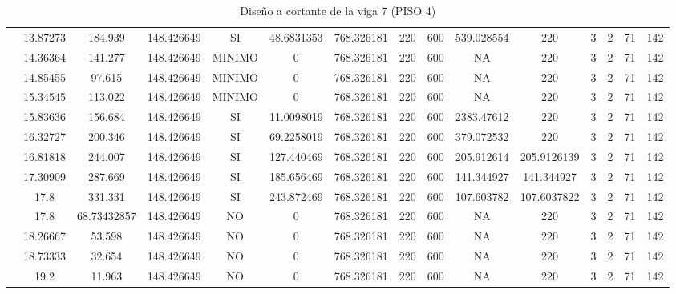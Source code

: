 \begin{table}[H]
{\begin{tabular}{|c|c|c|c|c|c|c|c|c|c|c|c|c|c|c|}
\cline{2-15}    & 13.87273 & 184.939 & 148.426649 & SI  & 48.6831353 & 768.326181 & 220 & 600 & 539.028554 & 220 & 3   & 2   & 71  & 142 \bigstrut\\
\cline{2-15}    & 14.36364 & 141.277 & 148.426649 & MINIMO & 0   & 768.326181 & 220 & 600 & NA  & 220 & 3   & 2   & 71  & 142 \bigstrut\\
\cline{2-15}    & 14.85455 & 97.615 & 148.426649 & MINIMO & 0   & 768.326181 & 220 & 600 & NA  & 220 & 3   & 2   & 71  & 142 \bigstrut\\
\cline{2-15}    & 15.34545 & 113.022 & 148.426649 & MINIMO & 0   & 768.326181 & 220 & 600 & NA  & 220 & 3   & 2   & 71  & 142 \bigstrut\\
\cline{2-15}    & 15.83636 & 156.684 & 148.426649 & SI  & 11.0098019 & 768.326181 & 220 & 600 & 2383.47612 & 220 & 3   & 2   & 71  & 142 \bigstrut\\
\cline{2-15}    & 16.32727 & 200.346 & 148.426649 & SI  & 69.2258019 & 768.326181 & 220 & 600 & 379.072532 & 220 & 3   & 2   & 71  & 142 \bigstrut\\
\cline{2-15}    & 16.81818 & 244.007 & 148.426649 & SI  & 127.440469 & 768.326181 & 220 & 600 & 205.912614 & 205.9126139 & 3   & 2   & 71  & 142 \bigstrut\\
\cline{2-15}    & 17.30909 & 287.669 & 148.426649 & SI  & 185.656469 & 768.326181 & 220 & 600 & 141.344927 & 141.344927 & 3   & 2   & 71  & 142 \bigstrut\\
\cline{2-15}    & 17.8 & 331.331 & 148.426649 & SI  & 243.872469 & 768.326181 & 220 & 600 & 107.603782 & 107.6037822 & 3   & 2   & 71  & 142 \bigstrut\\
\cline{2-15}    & 17.8 & 68.73432857 & 148.426649 & NO  & 0   & 768.326181 & 220 & 600 & NA  & 220 & 3   & 2   & 71  & 142 \bigstrut\\
\cline{2-15}    & 18.26667 & 53.598 & 148.426649 & NO  & 0   & 768.326181 & 220 & 600 & NA  & 220 & 3   & 2   & 71  & 142 \bigstrut\\
\cline{2-15}    & 18.73333 & 32.654 & 148.426649 & NO  & 0   & 768.326181 & 220 & 600 & NA  & 220 & 3   & 2   & 71  & 142 \bigstrut\\
\cline{2-15}    & 19.2 & 11.963 & 148.426649 & NO  & 0   & 768.326181 & 220 & 600 & NA  & 220 & 3   & 2   & 71  & 142 \bigstrut\\
\hline
\end{tabular}%

  
 
  }%
    \caption{Diseño a cortante de la viga 7 (PISO 4) }
  \label{tab:C VG7 P4 }%
\end{table}%
